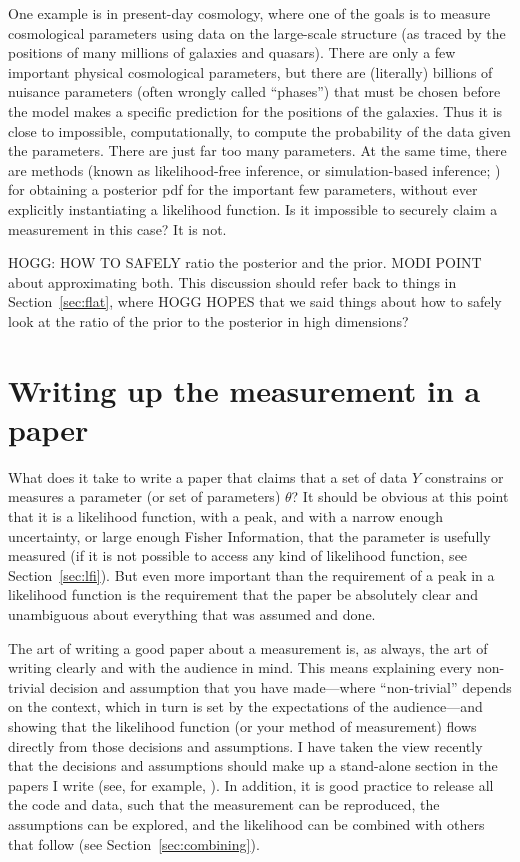 \documentclass{article}
\newcommand{\sectionname}{Section}
\newcommand{\secref}[1]{\sectionname~\ref{#1}}
\begin{document}
One example is in present-day cosmology, where one of the goals is to measure cosmological parameters using data on the large-scale structure (as traced by the positions of many millions of galaxies and quasars).
There are only a few important physical cosmological parameters, but there are (literally) billions of nuisance parameters (often wrongly called ``phases'') that must be chosen before the model makes a specific prediction for the positions of the galaxies.
Thus it is close to impossible, computationally, to compute the probability of the data given the parameters.
There are just far too many parameters.
At the same time, there are methods (known as likelihood-free inference, or simulation-based inference; \cite{abc, sbi}) for obtaining a posterior pdf for the important few parameters, without ever explicitly instantiating a likelihood function.
Is it impossible to securely claim a measurement in this case?
It is not.

HOGG: HOW TO SAFELY ratio the posterior and the prior. MODI POINT about approximating both.
This discussion should refer back to things in \secref{sec:flat}, where HOGG HOPES that we said things about how to safely look at the ratio of the prior to the posterior in high dimensions?

\section{Writing up the measurement in a paper}\label{sec:claim}
What does it take to write a paper that claims that a set of data $Y$ constrains or measures a parameter (or set of parameters) $\theta$?
It should be obvious at this point that it is a likelihood function, with a peak, and with a narrow enough uncertainty, or large enough Fisher Information, that the parameter is usefully measured
(if it is not possible to access any kind of likelihood function, see \secref{sec:lfi}).
But even more important than the requirement of a peak in a likelihood function is the requirement that the paper be absolutely clear and unambiguous about everything that was assumed and done.

The art of writing a good paper about a measurement is, as always, the art of writing clearly and with the audience in mind.
This means explaining every non-trivial decision and assumption that you have made---where ``non-trivial'' depends on the context, which in turn is set by the expectations of the audience---and showing that the likelihood function (or your method of measurement) flows directly from those decisions and assumptions.
I have taken the view recently that the decisions and assumptions should make up a stand-alone section in the papers I write (see, for example, \cite{frizzle}).
In addition, it is good practice to release all the code and data, such that the measurement can be reproduced, the assumptions can be explored, and the likelihood can be combined with others that follow (see \secref{sec:combining}).
\end{document}
